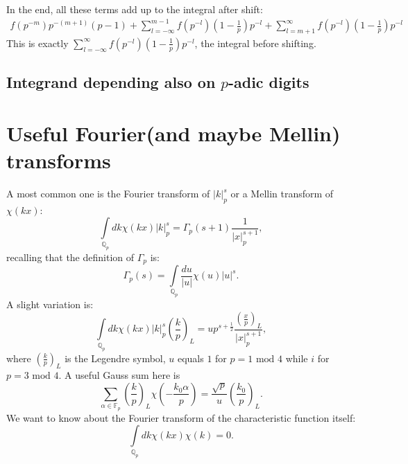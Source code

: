 \documentclass[12pt]{article}
\begin{document}
In the end, all these terms add up to the integral after shift:
\begin{equation}
\begin{aligned}
f(p^{-m})p^{-(m+1)}(p-1)+\sum\limits_{l=-\infty}^{m-1}f(p^{-l})(1-\frac{1}{p})p^{-l}+\sum\limits_{l=m+1}^{\infty}f(p^{-l})(1-\frac{1}{p}) p^{-l}
\end{aligned}
\end{equation}
This is exactly $\sum\limits_{l=-\infty}^{\infty}f(p^{-l})(1-\frac{1}{p})p^{-l}$, the integral before shifting.
\subsection{Integrand depending also on $p$-adic digits}
\section{Useful Fourier(and maybe Mellin) transforms}
A most common one is the Fourier transform of $|k|_p^s$ or a Mellin transform of $\chi(kx)$:
\begin{equation}
\int\limits_{\mathbb{Q}_p} dk \chi(kx)|k|_p^s=\Gamma_p(s+1)\frac{1}{|x|_p^{s+1}},
\end{equation}
recalling that the definition of $\Gamma_p$ is:
\begin{equation}
\Gamma_p(s)=\int\limits_{\mathbb{Q}_p}\frac{du}{|u|}\chi(u)|u|^s.
\end{equation}
A slight variation is:
\begin{equation}
\int\limits_{\mathbb{Q}_p} dk \chi(kx)|k|_p^s\left(\frac{k}{p}\right)_L=up^{s+\frac{1}{2}}\frac{\left(\frac{x}{p}\right)_L}{|x|_p^{s+1}},
\end{equation}
where $\left(\frac{k}{p}\right)_L$ is the Legendre symbol, $u$ equals $1$ for $p=1 \text{ mod } 4$ while $i$ for $p=3 \text{ mod } 4$. A useful Gauss sum here is
\begin{equation}
\sum\limits_{\alpha\in \mathbb{F}_p}\left(\frac{k}{p}\right)_L \chi\left(-\frac{k_0 \alpha}{p}\right)=\frac{\sqrt{p}}{u}\left(\frac{k_0}{p}\right)_L.
\end{equation}
We want to know about the Fourier transform of the characteristic function itself:
\begin{equation}
\int\limits_{\mathbb{Q}_p} dk \chi(kx)\chi(k)=0.
\end{equation}
\end{document}
